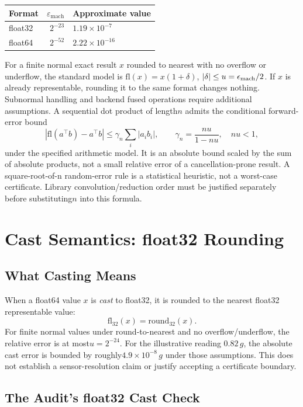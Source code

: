 \documentclass[11pt, a4paper]{article}
\theoremstyle{definition}
\theoremstyle{plain}
\newcommand{\eps}{\varepsilon}
\begin{document}
\begin{center}
\small
\begin{tabular}{@{}lrl@{}}
\toprule
Format & $\eps_{\text{mach}}$ & Approximate value \\
\midrule
float32 & $2^{-23}$ & $1.19 \times 10^{-7}$ \\
float64 & $2^{-52}$ & $2.22 \times 10^{-16}$ \\
\bottomrule
\end{tabular}
\end{center}

For a finite normal exact result $x$ rounded to nearest with no overflow
or underflow, the standard model is $\mathrm{fl}(x)=x(1+\delta)$,
$|\delta|\le u=\epsilon_{\rm mach}/2$. If $x$ is already representable,
rounding it to the same format changes nothing. Subnormal handling and
backend fused operations require additional assumptions. A sequential dot
product of length$n$ admits the conditional forward-error bound
\[
 |\mathrm{fl}(a^\top b)-a^\top b|\le\gamma_n\sum_i|a_ib_i|,
 \qquad \gamma_n=\frac{nu}{1-nu},\quad nu<1,
\]
under the specified arithmetic model. It is an absolute bound scaled by the
sum of absolute products, not a small relative error of a cancellation-prone
result. A square-root-of-n random-error rule is a statistical heuristic,
not a worst-case certificate. Library convolution/reduction order must be
justified separately before substituting$n$ into this formula.

\section{Cast Semantics: float32 Rounding}

\subsection{What Casting Means}

When a float64 value $x$ is \emph{cast} to float32, it is rounded to the nearest
float32 representable value:
\[
  \text{fl}_{32}(x) = \text{round}_{32}(x).
\]
For finite normal values under round-to-nearest and no overflow/underflow,
the relative error is at most$u=2^{-24}$. For the illustrative reading
$0.82\,g$, the absolute cast error is bounded by roughly$4.9\times10^{-8}\,g$
under those assumptions. This does not establish a sensor-resolution claim
or justify accepting a certificate boundary.

\subsection{The Audit's float32 Cast Check}
\end{document}
